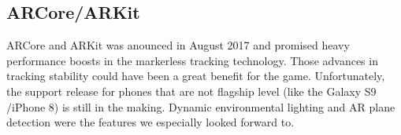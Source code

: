 \subsection{ARCore/ARKit}

ARCore and ARKit was anounced in August 2017 and promised heavy performance boosts in the markerless tracking technology. Those advances in tracking stability could have been a great benefit for the game. 
Unfortunately, the support release for phones that are not flagship level (like the Galaxy S9 /iPhone 8) is still in the making. Dynamic environmental lighting and AR plane detection
were the features we especially looked forward to.

